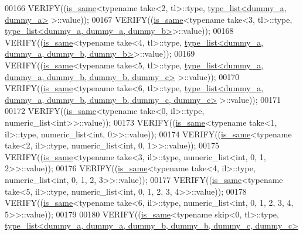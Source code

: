 \begin{DoxyCode}
00166   VERIFY((\hyperlink{struct_eigen_1_1internal_1_1is__same}{is\_same}<\textcolor{keyword}{typename} take<2, tl>::type, \hyperlink{struct_eigen_1_1internal_1_1type__list}{type\_list<dummy\_a, dummy\_a>}
      >::value));
00167   VERIFY((\hyperlink{struct_eigen_1_1internal_1_1is__same}{is\_same}<\textcolor{keyword}{typename} take<3, tl>::type, 
      \hyperlink{struct_eigen_1_1internal_1_1type__list}{type\_list<dummy\_a, dummy\_a, dummy\_b>}>::value));
00168   VERIFY((\hyperlink{struct_eigen_1_1internal_1_1is__same}{is\_same}<\textcolor{keyword}{typename} take<4, tl>::type, 
      \hyperlink{struct_eigen_1_1internal_1_1type__list}{type\_list<dummy\_a, dummy\_a, dummy\_b, dummy\_b>}>::value));
00169   VERIFY((\hyperlink{struct_eigen_1_1internal_1_1is__same}{is\_same}<\textcolor{keyword}{typename} take<5, tl>::type, 
      \hyperlink{struct_eigen_1_1internal_1_1type__list}{type\_list<dummy\_a, dummy\_a, dummy\_b, dummy\_b, dummy\_c>}
      >::value));
00170   VERIFY((\hyperlink{struct_eigen_1_1internal_1_1is__same}{is\_same}<\textcolor{keyword}{typename} take<6, tl>::type, 
      \hyperlink{struct_eigen_1_1internal_1_1type__list}{type\_list<dummy\_a, dummy\_a, dummy\_b, dummy\_b, dummy\_c, dummy\_c>}
      >::value));
00171 
00172   VERIFY((\hyperlink{struct_eigen_1_1internal_1_1is__same}{is\_same}<\textcolor{keyword}{typename} take<0, il>::type, numeric\_list<int>>::value));
00173   VERIFY((\hyperlink{struct_eigen_1_1internal_1_1is__same}{is\_same}<\textcolor{keyword}{typename} take<1, il>::type, numeric\_list<int, 0>>::value));
00174   VERIFY((\hyperlink{struct_eigen_1_1internal_1_1is__same}{is\_same}<\textcolor{keyword}{typename} take<2, il>::type, numeric\_list<int, 0, 1>>::value));
00175   VERIFY((\hyperlink{struct_eigen_1_1internal_1_1is__same}{is\_same}<\textcolor{keyword}{typename} take<3, il>::type, numeric\_list<int, 0, 1, 2>>::value));
00176   VERIFY((\hyperlink{struct_eigen_1_1internal_1_1is__same}{is\_same}<\textcolor{keyword}{typename} take<4, il>::type, numeric\_list<int, 0, 1, 2, 3>>::value));
00177   VERIFY((\hyperlink{struct_eigen_1_1internal_1_1is__same}{is\_same}<\textcolor{keyword}{typename} take<5, il>::type, numeric\_list<int, 0, 1, 2, 3, 4>>::value));
00178   VERIFY((\hyperlink{struct_eigen_1_1internal_1_1is__same}{is\_same}<\textcolor{keyword}{typename} take<6, il>::type, numeric\_list<int, 0, 1, 2, 3, 4, 5>>::value));
00179   
00180   VERIFY((\hyperlink{struct_eigen_1_1internal_1_1is__same}{is\_same}<\textcolor{keyword}{typename} skip<0, tl>::type, 
      \hyperlink{struct_eigen_1_1internal_1_1type__list}{type\_list<dummy\_a, dummy\_a, dummy\_b, dummy\_b, dummy\_c, dummy\_c>}

\end{DoxyCode}
